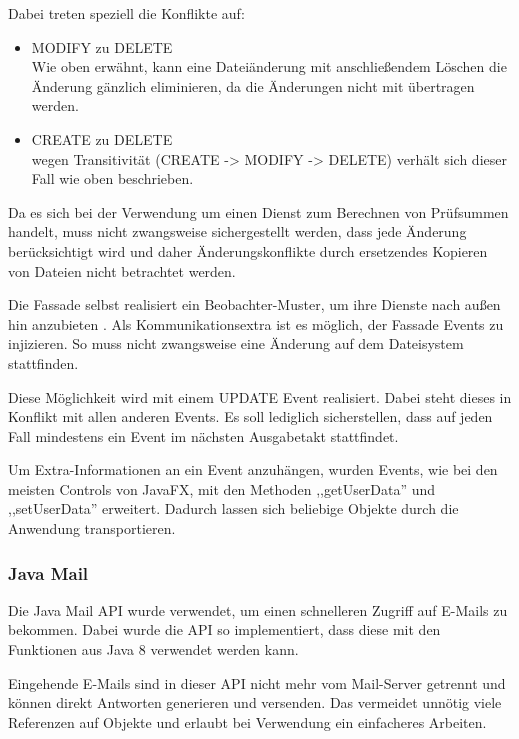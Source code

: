 \documentclass[oneside, ngerman, toc=bibliography,bibliography=totoc,listof=entryprefix, open=right,numbers=noenddot,fontsize=12pt]{scrbook}
\begin{document}
\bigskip
Dabei treten speziell die Konflikte auf:

\begin{itemize}
    \item MODIFY zu DELETE \\
    Wie oben erwähnt, kann eine Dateiänderung mit anschließendem Löschen die Änderung gänzlich eliminieren, da die Änderungen nicht mit übertragen werden.
    \item CREATE zu DELETE \\
    wegen Transitivität (CREATE -> MODIFY -> DELETE) verhält sich dieser Fall wie oben beschrieben.
\end{itemize}

Da es sich bei der Verwendung um einen Dienst zum Berechnen von Prüfsummen handelt, muss nicht zwangsweise sichergestellt werden, dass jede Änderung berücksichtigt wird und daher Änderungskonflikte durch ersetzendes Kopieren von Dateien nicht betrachtet werden.

Die Fassade selbst realisiert ein Beobachter-Muster, um ihre Dienste nach außen hin anzubieten \cite{gamma2011entwurfsmuster}.
Als Kommunikationsextra ist es möglich, der Fassade Events zu injizieren. So muss nicht zwangsweise eine Änderung auf dem Dateisystem stattfinden.

Diese Möglichkeit wird mit einem UPDATE Event realisiert.
Dabei steht dieses in Konflikt mit allen anderen Events. Es soll lediglich sicherstellen, dass auf jeden Fall mindestens ein Event im nächsten Ausgabetakt stattfindet.

Um Extra-Informationen an ein Event anzuhängen, wurden Events, wie bei den meisten Controls von JavaFX, mit den Methoden ,,getUserData'' und ,,setUserData'' erweitert. Dadurch lassen sich beliebige Objekte durch die Anwendung transportieren. 



\subsubsection{Java Mail}
Die Java Mail API wurde verwendet, um einen schnelleren Zugriff auf E-Mails zu bekommen. Dabei wurde die API so implementiert, dass diese mit den Funktionen aus Java 8 verwendet werden kann.

Eingehende E-Mails sind in dieser API nicht mehr vom Mail-Server getrennt und können direkt Antworten generieren und versenden. Das vermeidet unnötig viele Referenzen auf Objekte und erlaubt bei Verwendung ein einfacheres Arbeiten.
\end{document}
